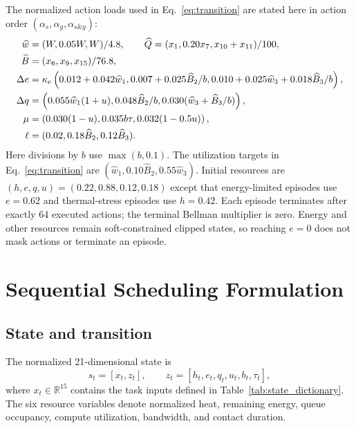 \documentclass[11pt]{article}
\newcommand{\R}{\mathbb{R}}
\begin{document}
The normalized action loads used in Eq.~\eqref{eq:transition} are stated here in action order $(\alpha_s,\alpha_g,\alpha_{s\&g})$:
\begin{align}
\widehat w&=(W,0.05W,W)/4.8,\qquad
\widehat Q=(x_1,0.20x_7,x_{10}+x_{11})/100,\notag\\
\widehat B&=(x_6,x_9,x_{15})/76.8,\notag\\
\Delta e&=\kappa_e\left(0.012+0.042\widehat w_1,
0.007+0.025\widehat B_2/b,
0.010+0.025\widehat w_3+0.018\widehat B_3/b\right),\notag\\
\Delta q&=\left(0.055\widehat w_1(1+u),
0.048\widehat B_2/b,
0.030(\widehat w_3+\widehat B_3/b)\right),\notag\\
\mu&=\left(0.030(1-u),0.035b\tau,0.032(1-0.5u)\right),\notag\\
\ell&=(0.02,0.18\widehat B_2,0.12\widehat B_3).
\label{eq:action_loads}
\end{align}
Here divisions by $b$ use $\max(b,0.1)$. The utilization targets in Eq.~\eqref{eq:transition} are $(\widehat w_1,0.10\widehat B_2,0.55\widehat w_3)$. Initial resources are $(h,e,q,u)=(0.22,0.88,0.12,0.18)$ except that energy-limited episodes use $e=0.62$ and thermal-stress episodes use $h=0.42$. Each episode terminates after exactly 64 executed actions; the terminal Bellman multiplier is zero. Energy and other resources remain soft-constrained clipped states, so reaching $e=0$ does not mask actions or terminate an episode.

\section{Sequential Scheduling Formulation}
\label{sec:mdp}

\subsection{State and transition}

The normalized 21-dimensional state is
\begin{equation}
s_t=[x_t,z_t],\qquad z_t=[h_t,e_t,q_t,u_t,b_t,\tau_t],
\end{equation}
where $x_t\in\R^{15}$ contains the task inputs defined in Table~\ref{tab:state_dictionary}. The six resource variables denote normalized heat, remaining energy, queue occupancy, compute utilization, bandwidth, and contact duration.
\end{document}
